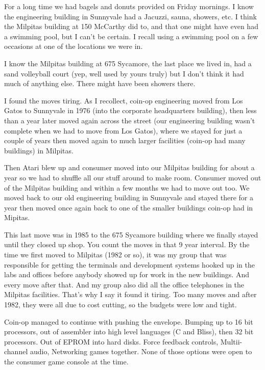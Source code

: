 For a long time we had bagels and donuts provided on Friday mornings. I know the engineering building in Sunnyvale had a Jacuzzi, sauna, showers, etc. I think the Milpitas building at 150 McCarthy did to, and that one might have even had a swimming pool, but I can't be certain. I recall using a swimming pool on a few occasions at one of the locations we were in.

I know the Milpitas building at 675 Sycamore, the last place we lived in, had a sand volleyball court (yep, well used by yours truly) but I don't think it had much of anything else. There might have been showers there. 

I found the moves tiring. As I recollect, coin-op engineering moved from Los Gatos to Sunnyvale in 1976 (into the corporate headquarters building), then less than a year later moved again across the street (our engineering building wasn't complete when we had to move from Los Gatos), where we stayed for just a couple of years then moved again to much larger facilities (coin-op had many buildings) in Milpitas. 

Then Atari blew up and consumer moved into our Milpitas building for about a year so we had to shuffle all our stuff around to make room. Consumer moved out of the Milpitas building and within a few months we had to move out too. We moved back to our old engineering building in Sunnyvale and stayed there for a year then moved once again back to one of the smaller buildings coin-op had in Mipitas. 

This last move was in 1985 to the 675 Sycamore building where we finally stayed until they closed up shop. You count the moves in that 9 year interval. By the time we first moved to Milpitas (1982 or so), it was my group that was responsible for getting the terminals and development systems hooked up in the labs and offices before anybody showed up for work in the new buildings. And every move after that. And my group also did all the office telephones in the Milpitas facilities. That's why I say it found it tiring. Too many moves and after 1982, they were all due to cost cutting, so the budgets were low and tight. 

Coin-op managed to continue with pushing the envelope. Bumping up to 16 bit processors, out of assembler into high level languages (C and Bliss), then 32 bit processors. Out of EPROM into hard disks. Force feedback controls, Multii-channel audio, Networking games together. None of those options were open to the consumer game console at the time.


